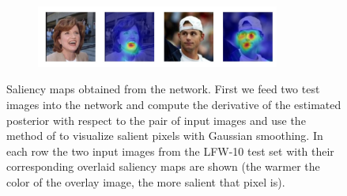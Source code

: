 \begin{figure}
    \begin{subfigure}
        \centering
        \includegraphics[width=8cm, trim={0 1cm 0 0},clip]{saliency-new/saliency-smooth/goodlooking-1.jpeg}
        \footnotesize
    \end{subfigure}
    
    \caption{Saliency maps obtained from the network. First we feed two test images into the network and compute the derivative of the estimated posterior with respect to the pair of input images and use the method of \cite{saliency} to visualize salient pixels with  Gaussian smoothing. In each row the two input images from the LFW-10 test set with their corresponding overlaid saliency maps are shown (the warmer the color of the overlay image, the more salient that pixel is).}
    \label{fig.5}
\end{figure}
